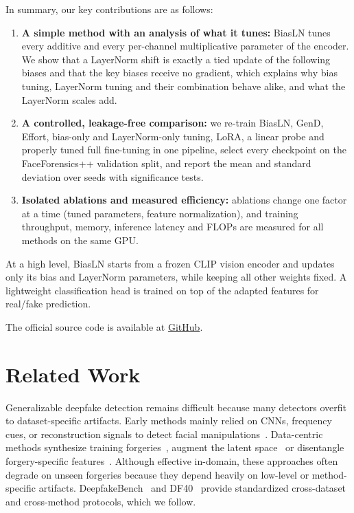 \documentclass[fonts]{icst}
\begin{document}
In summary, our key contributions are as follows:
\begin{enumerate}
    \item \textbf{A simple method with an analysis of what it tunes:} BiasLN tunes every additive and every per-channel multiplicative parameter of the encoder. We show that a LayerNorm shift is exactly a tied update of the following biases and that the key biases receive no gradient, which explains why bias tuning, LayerNorm tuning and their combination behave alike, and what the LayerNorm scales add.

    \item \textbf{A controlled, leakage-free comparison:} we re-train BiasLN, GenD, Effort, bias-only and LayerNorm-only tuning, LoRA, a linear probe and properly tuned full fine-tuning in one pipeline, select every checkpoint on the FaceForensics++ validation split, and report the mean and standard deviation over seeds with significance tests.

    \item \textbf{Isolated ablations and measured efficiency:} ablations change one factor at a time (tuned parameters, feature normalization), and training throughput, memory, inference latency and FLOPs are measured for all methods on the same GPU.
\end{enumerate}
At a high level, BiasLN starts from a frozen CLIP vision encoder and updates only its bias and LayerNorm parameters, while keeping all other weights fixed.
A lightweight classification head is trained on top of the adapted features for real/fake prediction.

The official source code is available at \href{https://github.com/ducthinh4477/BiasLN}{GitHub}.


\section{Related Work}

Generalizable deepfake detection remains difficult because many detectors overfit to dataset-specific artifacts. Early methods mainly relied on CNNs, frequency cues, or reconstruction signals to detect facial manipulations~\cite{rossler2019ff,qian2020frequency,luo2021srm,liu2021spsl,cao2022recce}. Data-centric methods synthesize training forgeries~\cite{shiohara2022sbi,chen2022sladd,lin2024cdfa}, augment the latent space~\cite{yan2024latent} or disentangle forgery-specific features~\cite{yan2023ucf,huang2023iid}. Although effective in-domain, these approaches often degrade on unseen forgeries because they depend heavily on low-level or method-specific artifacts. DeepfakeBench~\cite{yan2023deepfakebench} and DF40~\cite{yan2024df40} provide standardized cross-dataset and cross-method protocols, which we follow.
\end{document}
